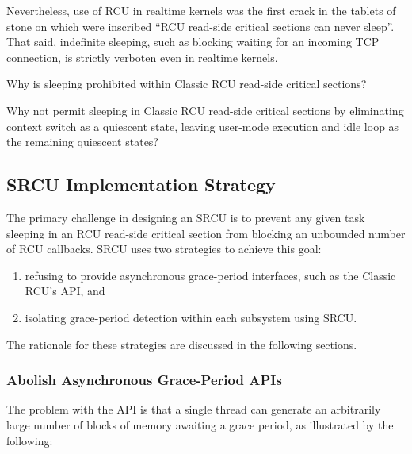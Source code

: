 Nevertheless,
use of RCU in realtime kernels was the first crack in the tablets
of stone on which were inscribed ``RCU read-side critical sections can never
sleep''.
That said, indefinite sleeping, such as blocking waiting for an
incoming TCP connection, is strictly verboten even in realtime kernels.

\QuickQuiz{}
	Why is sleeping prohibited within Classic RCU read-side
	critical sections?
 \QuickQuizEnd

\QuickQuiz{}
	Why not permit sleeping in Classic RCU read-side critical sections
	by eliminating context switch as a quiescent state, leaving user-mode
	execution and idle loop as the remaining quiescent states?
 \QuickQuizEnd

\subsection{SRCU Implementation Strategy}
\label{sec:app:rcuimpl:SRCU Implementation Strategy}

The primary challenge in designing an SRCU
is to prevent any given task sleeping in an RCU read-side
critical section from blocking an unbounded number of RCU callbacks.
SRCU uses two strategies to achieve this goal:
\begin{enumerate}
\item	refusing to provide asynchronous grace-period interfaces,
	such as the Classic RCU's  API, and
\item	isolating grace-period detection within each subsystem using SRCU.
\end{enumerate}
The rationale for these strategies are discussed in the following sections.

\subsubsection{Abolish Asynchronous Grace-Period APIs}
\label{sec:app:rcuimpl:Abolish Asynchronous Grace-Period APIs}

The problem with the  API is that a single thread can
generate an arbitrarily large number of blocks of memory awaiting a
grace period, as illustrated by the following:

